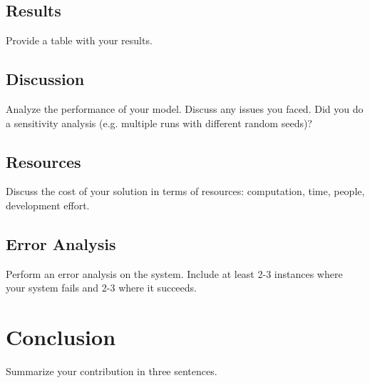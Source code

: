\documentclass[11pt,a4paper]{article}
\begin{document}
\subsection{Results}
Provide a table with your results.

\subsection{Discussion}
Analyze the performance of your model. Discuss any issues you faced. Did you do a sensitivity analysis (e.g. multiple runs with different random seeds)?

\subsection{Resources}
Discuss the cost of your solution in terms of resources: computation, time, people, development effort.


\subsection{Error Analysis}
Perform an error analysis on the system. Include at least 2-3 instances where your system fails and 2-3 where it succeeds.


\section{Conclusion}
Summarize your contribution in three sentences.



\end{document}
